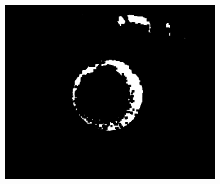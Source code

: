 \documentclass{article}
\begin{document}
\begin{figure}[H]
\begin{subfigure}{.09\textwidth}
  \label{fig:arrow}
\end{subfigure}%
\begin{subfigure}{.37\textwidth}
  \centering
  \includegraphics[width=0.97\linewidth]{_Figures/raw_data_3_erosion.png}
  \caption{}
  \label{fig:raw_3_erosion}
\end{subfigure}



\end{figure}
\end{document}
